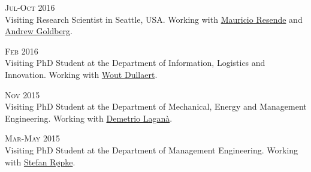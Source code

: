 \begin{paracol}{2}
  \textsc{Jul-Oct 2016}
\switchcolumn
  \\
  Visiting Research Scientist in Seattle, USA. Working with \href{https://scholar.google.com/citations?user=KTmPx50AAAAJ}{Mauricio Resende} and \href{https://scholar.google.it/citations?user=U5iFVowAAAAJ}{Andrew Goldberg}.
\end{paracol}

\begin{paracol}{2}
  \textsc{Feb 2016}
\switchcolumn
  \\
  Visiting PhD Student at the Department of Information, Logistics and Innovation. Working with \href{https://scholar.google.com/citations?user=wjjCd5UAAAAJ}{Wout Dullaert}.
\end{paracol}

\begin{paracol}{2}
  \textsc{Nov 2015}
\switchcolumn
  \\
  Visiting PhD Student at the Department of Mechanical, Energy and Management Engineering. Working with \href{https://scholar.google.com/citations?user=r_qFOqgAAAAJ}{Demetrio Laganà}.
\end{paracol}

\begin{paracol}{2}
  \textsc{Mar-May 2015}
\switchcolumn
  \\
  Visiting PhD Student at the Department of Management Engineering. Working with \href{https://scholar.google.com/citations?user=sYi141QAAAAJ}{Stefan Røpke}.
\end{paracol}

%

